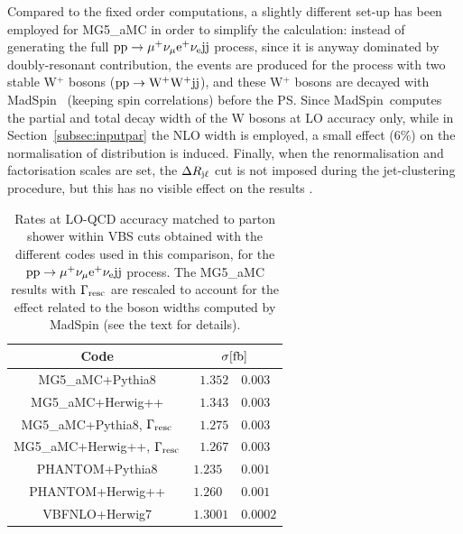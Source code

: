 Compared to the fixed order computations, a slightly different set-up has been employed for {\sc MG5\_aMC} in order to simplify the calculation: instead of generating the full
${\rm p}{\rm p}\to\mu^+\nu_\mu{\rm e}^+\nu_{\rm e}{\rm j}{\rm j}$ process, since it is anyway dominated by doubly-resonant contribution, the
events are produced for the process with two stable W$^+$ bosons (${\rm p}{\rm p}\to{\rm W^+}{\rm W^+}{\rm j}{\rm j}$), and these W$^+$ bosons
are decayed with {\sc MadSpin}~\cite{Artoisenet:2012st} (keeping spin correlations) before the PS. Since {\sc MadSpin}\ computes
the partial and total decay width of the W bosons at LO accuracy only, while in Section~\ref{subsec:inputpar} the NLO width is employed,
a small effect (6\%) on the normalisation of distribution is induced. Finally, when the renormalisation
and factorisation scales are set, the $\Delta R_{\text{j}\ell}$ cut is not imposed during the jet-clustering procedure, but this has no visible effect
on the results .

\begin{table}[h!]
    \centering
    \begin{tabular}{c|r@{ $\pm$ }l}
      Code  &  \multicolumn{2}{c}{$\sigma[\rm{fb}]$}  \\
        \hline\hline
        {\sc MG5\_aMC}+{\sc Pythia8}&  $1.352 $ & $0.003$  \\
        {\sc MG5\_aMC}+{\sc Herwig++}&  $1.343 $ & $ 0.003$  \\
        {\sc MG5\_aMC}+{\sc Pythia8}, $\Gamma_{\rm resc}$&  $1.275$ & $0.003$  \\
        {\sc MG5\_aMC}+{\sc Herwig++}, $\Gamma_{\rm resc}$&  $1.267$ & $ 0.003$  \\
        {\sc PHANTOM}+{\sc Pythia8} &  $1.235\phantom{0} $ & $0.001$  \\
        {\sc PHANTOM}+{\sc Herwig++} &  $1.260\phantom{0} $ & $0.001$  \\
        {\sc VBFNLO}+{\sc Herwig7} &  $1.3001$ & $0.0002$  \\
    \end{tabular}
    \caption{\label{tab:PSratesLO} Rates at LO-QCD accuracy matched to parton shower within VBS cuts obtained with the different codes used in this comparison,
    for the ${\rm p}{\rm p}\to\mu^+\nu_\mu{\rm e}^+\nu_{\rm e}{\rm j}{\rm j}$ process. The {\sc MG5\_aMC} results with $\Gamma_{\rm resc}$ 
    are rescaled to account for the effect related to the boson widths computed by {\sc MadSpin} (see the text for details).}
\end{table}


